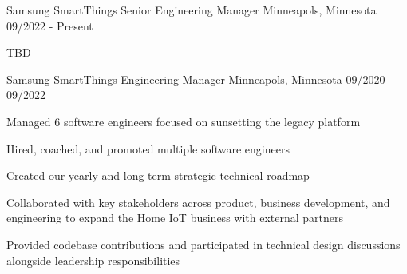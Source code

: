 

\begin{cventries}

  \cventry
    {Samsung SmartThings} %
    {Senior Engineering Manager} %
    {Minneapols, Minnesota} %
    {09/2022 - Present} %
    {
      \begin{cvitems} %
        \item {TBD}      
      \end{cvitems}
    }

  \cventry
    {Samsung SmartThings} %
    {Engineering Manager} %
    {Minneapols, Minnesota} %
    {09/2020 - 09/2022} %
    {
      \begin{cvitems} %
        \item {Managed 6 software engineers focused on sunsetting the legacy platform}
        \item {Hired, coached, and promoted multiple software engineers}
        \item {Created our yearly and long-term strategic technical roadmap}
        \item {Collaborated with key stakeholders across product, business development, and engineering to expand the Home IoT business with external partners}
        \item {Provided codebase contributions and participated in technical design discussions alongside leadership responsibilities}
      \end{cvitems}
    }


\end{cventries}
